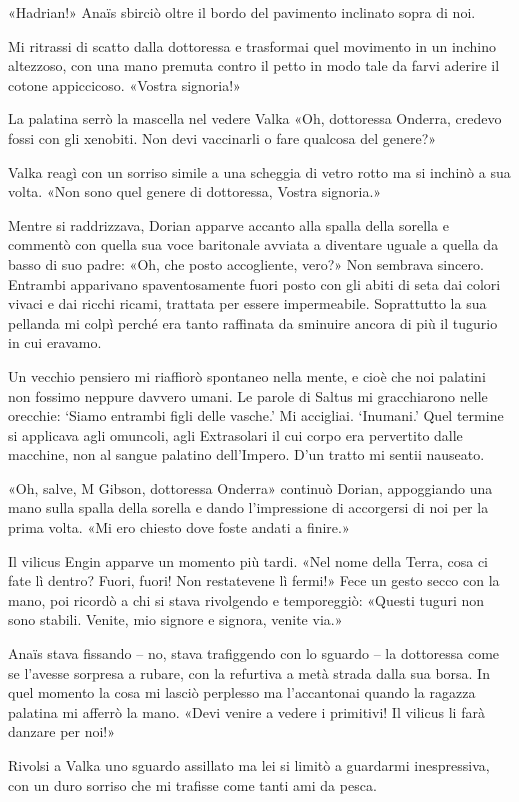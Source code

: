 «Hadrian!» Anaïs sbirciò oltre il bordo del pavimento inclinato sopra di
noi.

Mi ritrassi di scatto dalla dottoressa e trasformai quel movimento in un
inchino altezzoso, con una mano premuta contro il petto in modo tale da
farvi aderire il cotone appiccicoso. «Vostra signoria!»

La palatina serrò la mascella nel vedere Valka «Oh, dottoressa Onderra,
credevo fossi con gli xenobiti. Non devi vaccinarli o fare qualcosa del
genere?»

Valka reagì con un sorriso simile a una scheggia di vetro rotto ma si
inchinò a sua volta. «Non sono quel genere di dottoressa, Vostra
signoria.»

Mentre si raddrizzava, Dorian apparve accanto alla spalla della sorella
e commentò con quella sua voce baritonale avviata a diventare uguale a
quella da basso di suo padre: «Oh, che posto accogliente, vero?» Non
sembrava sincero. Entrambi apparivano spaventosamente fuori posto con
gli abiti di seta dai colori vivaci e dai ricchi ricami, trattata per
essere impermeabile. Soprattutto la sua pellanda mi colpì perché era
tanto raffinata da sminuire ancora di più il tugurio in cui eravamo.

Un vecchio pensiero mi riaffiorò spontaneo nella mente, e cioè che noi
palatini non fossimo neppure davvero umani. Le parole di Saltus mi
gracchiarono nelle orecchie: `Siamo entrambi figli delle vasche.' Mi
accigliai. `Inumani.' Quel termine si applicava agli omuncoli, agli
Extrasolari il cui corpo era pervertito dalle macchine, non al sangue
palatino dell'Impero. D'un tratto mi sentii nauseato.

«Oh, salve, M Gibson, dottoressa Onderra» continuò Dorian, appoggiando
una mano sulla spalla della sorella e dando l'impressione di accorgersi
di noi per la prima volta. «Mi ero chiesto dove foste andati a finire.»

Il vilicus Engin apparve un momento più tardi. «Nel nome della Terra,
cosa ci fate lì dentro? Fuori, fuori! Non restatevene lì fermi!» Fece un
gesto secco con la mano, poi ricordò a chi si stava rivolgendo e
temporeggiò: «Questi tuguri non sono stabili. Venite, mio signore e
signora, venite via.»

Anaïs stava fissando -- no, stava trafiggendo con lo sguardo -- la
dottoressa come se l'avesse sorpresa a rubare, con la refurtiva a metà
strada dalla sua borsa. In quel momento la cosa mi lasciò perplesso ma
l'accantonai quando la ragazza palatina mi afferrò la mano. «Devi venire
a vedere i primitivi! Il vilicus li farà danzare per noi!»

Rivolsi a Valka uno sguardo assillato ma lei si limitò a guardarmi
inespressiva, con un duro sorriso che mi trafisse come tanti ami da
pesca.


